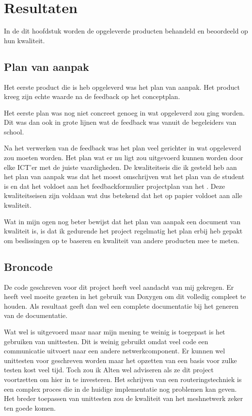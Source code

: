 \documentclass[a4paper, 11pt, oneside]{report}
\begin{document}
\chapter{Resultaten}\label{sec:resultaten}

In de dit hoofdstuk worden de opgeleverde producten behandeld en beoordeeld op hun kwaliteit.

\section{Plan van aanpak}\label{sec:plan-van-aanpak}
Het eerste product die is heb opgeleverd was het plan van aanpak.
Het product kreeg zijn echte waarde na de feedback op het conceptplan.

Het eerste plan was nog niet concreet genoeg in wat opgeleverd zou ging worden. 
Dit was dan ook in grote lijnen wat de feedback was vanuit de begeleiders van school.

Na het verwerken van de feedback was het plan veel gerichter in wat opgeleverd zou moeten worden.
Het plan wat er nu ligt zou uitgevoerd kunnen worden door elke ICT'er met de juiste vaardigheden.
De kwaliteitseis die ik gesteld heb aan het plan van aanpak was dat het moest omschrijven wat het plan van de student is en dat het voldoet aan het feedbackformulier projectplan van het \citeauthor{HANfeed} \citeyear{HANfeed}. Deze kwaliteitseisen zijn voldaan wat dus betekend dat het op papier voldoet aan alle kwaliteit.

Wat in mijn ogen nog beter bewijst dat het plan van aanpak een document van kwaliteit is, is dat ik gedurende het project regelmatig het plan erbij heb gepakt om beslissingen op te baseren en kwaliteit van andere producten mee te meten.

\section{Broncode}\label{sec:broncode}
De code geschreven voor dit project heeft veel aandacht van mij gekregen. 
Er heeft veel moeite gezeten in het gebruik van Doxygen om dit volledig compleet te houden.
Als resultaat geeft dan wel een complete documentatie bij het generen van de documentatie. 

Wat wel is uitgevoerd maar naar mijn mening te weinig is toegepast is het gebruiken van unittesten.
Dit is weinig gebruikt omdat veel code een communicatie uitvoert naar een andere netwerkcomponent.
Er kunnen wel unittesten voor geschreven worden maar het opzetten van een basis voor zulke testen kost veel tijd.
Toch zou ik Alten wel adviseren als ze dit project voortzetten om hier in te investeren.
Het schrijven van een routeringstechniek is een complex proces die in de huidige implementatie nog problemen kan geven.
Het breder toepassen van unittesten zou de kwaliteit van het meshnetwerk zeker ten goede komen. 
\end{document}
